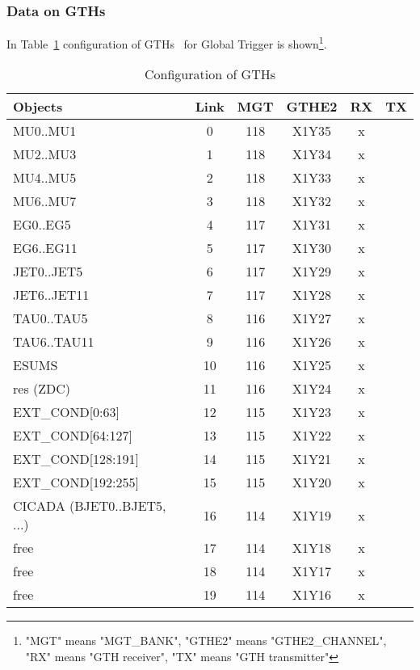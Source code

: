 \clearpage

\subsubsection{Data on GTHs}\label{sec:app:gth_conf_table}

In Table~\ref{tab:app:gth_conf} configuration of GTHs~\cite{GTHs} for Global Trigger is shown\footnote{"MGT" means "MGT\_BANK", "GTHE2" means "GTHE2\_CHANNEL", "RX" means "GTH receiver", "TX" means "GTH transmitter"}.

\begin{longtable}{|l|c|c|c|c|c|}
\caption{Configuration of GTHs}
    \label{tab:app:gth_conf}\\
\hline
\textbf{Objects}& \textbf{Link}& \textbf{MGT}& \textbf{GTHE2}& \textbf{RX}& \textbf{TX}\\
\hline
\hline
\endhead
MU0..MU1  & 0  & 118 & X1Y35 & x &   \\\hline
MU2..MU3  & 1  & 118 & X1Y34 & x &   \\\hline
MU4..MU5  & 2  & 118 & X1Y33 & x &   \\\hline
MU6..MU7  & 3  & 118 & X1Y32 & x &   \\\hline
EG0..EG5  & 4  & 117 & X1Y31 & x &   \\\hline
EG6..EG11 & 5  & 117 & X1Y30 & x &   \\\hline
JET0..JET5  & 6  & 117 & X1Y29 & x &   \\\hline
JET6..JET11 & 7  & 117 & X1Y28 & x &   \\\hline
TAU0..TAU5  & 8  & 116 & X1Y27 & x &   \\\hline
TAU6..TAU11 & 9  & 116 & X1Y26 & x &   \\\hline
ESUMS  & 10  & 116 & X1Y25 & x &   \\\hline
res (ZDC) & 11  & 116 & X1Y24 & x &   \\\hline
EXT\_COND[0:63] & 12  & 115 & X1Y23 & x &   \\\hline
EXT\_COND[64:127] & 13  & 115 & X1Y22 & x &   \\\hline
EXT\_COND[128:191] & 14  & 115 & X1Y21 & x &   \\\hline
EXT\_COND[192:255] & 15  & 115 & X1Y20 & x &   \\\hline
CICADA (BJET0..BJET5, ...)& 16  & 114 & X1Y19 & x &   \\\hline
free & 17  & 114 & X1Y18 & x &   \\\hline
free & 18  & 114 & X1Y17 & x &   \\\hline
free & 19  & 114 & X1Y16 & x &   \\\hline

\end{longtable}
